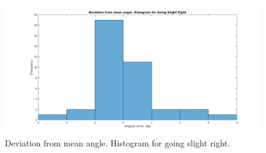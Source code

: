 \documentclass[paper=a4, fontsize=11pt]{scrartcl} %
\begin{document}
	\begin{figure}[h!]
		\begin{center}
			\setlength{\fboxsep}{0.5pt} %
			\setlength{\fboxrule}{0.5pt}
			\includegraphics[width=\linewidth,fbox]{images/histogram_3_phi_slightRight.png}
			\caption{Deviation from mean angle. Histogram for going slight right.}
		\end{center}
	\end{figure}
 

    \newpage
\end{document}
